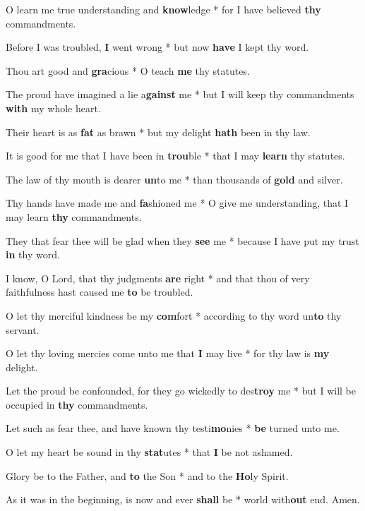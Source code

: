 \begin{multicols}{2}
	O learn me true understanding and \textbf{know}ledge * for I have believed \textbf{thy} commandments.
	
	Before I was troubled, \textbf{I} went wrong * but now \textbf{have} I kept thy word.
	
	Thou art good and \textbf{gra}cious * O teach \textbf{me} thy statutes.
	
	The proud have imagined a lie a\textbf{gainst} me * but I will keep thy commandments \textbf{with} my whole heart.
	
	Their heart is as \textbf{fat} as brawn * but my delight \textbf{hath} been in thy law.
	
	It is good for me that I have been in \textbf{trou}ble * that I may \textbf{learn} thy statutes.
	
	The law of thy mouth is dearer \textbf{un}to me * than thousands of \textbf{gold} and silver.
	
	Thy hands have made me and \textbf{fa}shioned me * O give me understanding, that I may learn \textbf{thy} commandments.
	
	They that fear thee will be glad when they \textbf{see} me * because I have put my trust \textbf{in} thy word.
	
	I know, O Lord, that thy judgments \textbf{are} right * and that thou of very faithfulness hast caused me \textbf{to} be troubled.
	
	O let thy merciful kindness be my \textbf{com}fort * according to thy word un\textbf{to} thy servant.
	
	O let thy loving mercies come unto me that \textbf{I} may live * for thy law is \textbf{my} delight.
	
	Let the proud be confounded, for they go wickedly to des\textbf{troy} me * but I will be occupied in \textbf{thy} commandments.
	
	Let such as fear thee, and have known thy testi\textbf{mo}nies * \textbf{be} turned unto me.
	
	O let my heart be sound in thy \textbf{stat}utes * that \textbf{I} be not ashamed.
	
	Glory be to the Father, and \textbf{to} the Son * and to the \textbf{Ho}ly Spirit.
	
	As it was in the beginning, is now and ever \textbf{shall} be * world with\textbf{out} end. Amen.
\end{multicols}